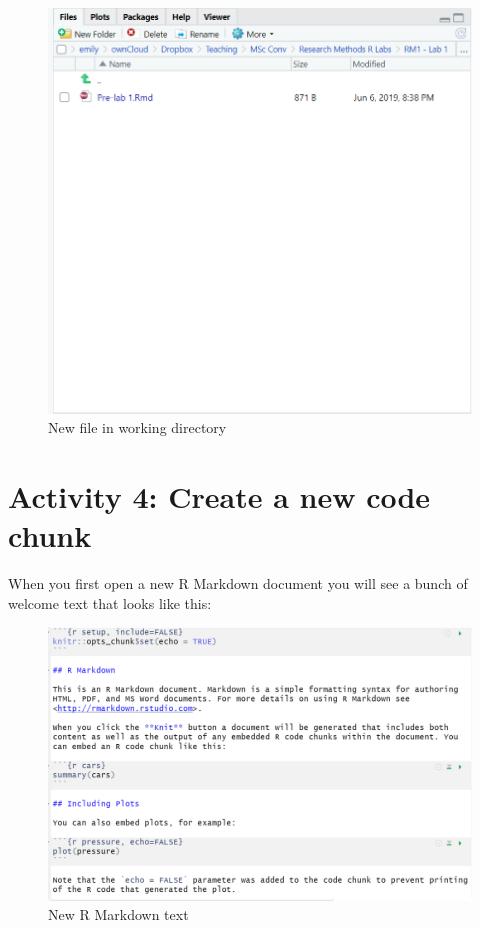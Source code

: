 \documentclass[]{book}
\begin{document}
\begin{figure}

{\centering \includegraphics[width=1\linewidth]{images/file-dir} 

}

\caption{New file in working directory}\label{fig:img-file-dir}
\end{figure}

\hypertarget{activity-4-create-a-new-code-chunk}{%
\section{Activity 4: Create a new code chunk}\label{activity-4-create-a-new-code-chunk}}

When you first open a new R Markdown document you will see a bunch of welcome text that looks like this:

\begin{figure}

{\centering \includegraphics[width=1\linewidth]{images/markdown-default} 

}

\caption{New R Markdown text}\label{fig:img-markdown-default}
\end{figure}
\end{document}
